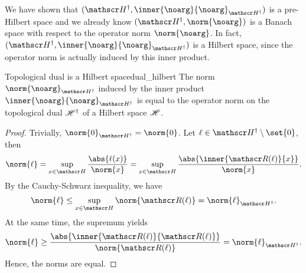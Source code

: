We have shown that \((\hilbert^\dag, \inner{\noarg}{\noarg}_{\hilbert^\dag})\) is a pre-Hilbert space and we already know \((\hilbert^\dag, \norm{\noarg})\) is a Banach space with respect to the operator norm \(\norm{\noarg}\). In fact, \((\hilbert^\dag, \inner{\noarg}{\noarg}_{\hilbert^\dag})\) is a Hilbert space, since the operator norm is actually induced by this inner product.
\begin{theorem}{Topological dual is a Hilbert space}{dual_hilbert}
    The norm \(\norm{\noarg}_{\hilbert^\dag}\) induced by the inner product \(\inner{\noarg}{\noarg}_{\hilbert^\dag}\) is equal to the operator norm on the topological dual \(\mathscr{H}^\dag\) of a Hilbert space \(\mathscr{H}\).
\end{theorem}
\begin{proof}
    Trivially, \(\norm{0}_{\hilbert^\dag} = \norm{0}\). Let \(\ell \in \hilbert^\dag\setminus\set{0}\), then
    \begin{equation*}
        \norm{\ell} = \sup_{x \in \hilbert} \frac{\abs{\ell(x)}}{\norm{x}} = \sup_{x \in \hilbert} \frac{\abs{\inner{\riesz(\ell)}{x}}}{\norm{x}}.
    \end{equation*}
    By the Cauchy-Schwarz inequality, we have
    \begin{equation*}
        \norm{\ell} \leq \sup_{x\in \hilbert} \norm{\riesz(\ell)} = \norm{\ell}_{\hilbert^\dag}.
    \end{equation*}
    At the same time, the supremum yields
    \begin{equation*}
        \norm{\ell} \geq \frac{\abs{\inner{\riesz(\ell)}{\riesz(\ell)}}}{\norm{\riesz(\ell)}} = \norm{\ell}_{\hilbert^\dag}.
    \end{equation*}
    Hence, the norms are equal.
\end{proof}


